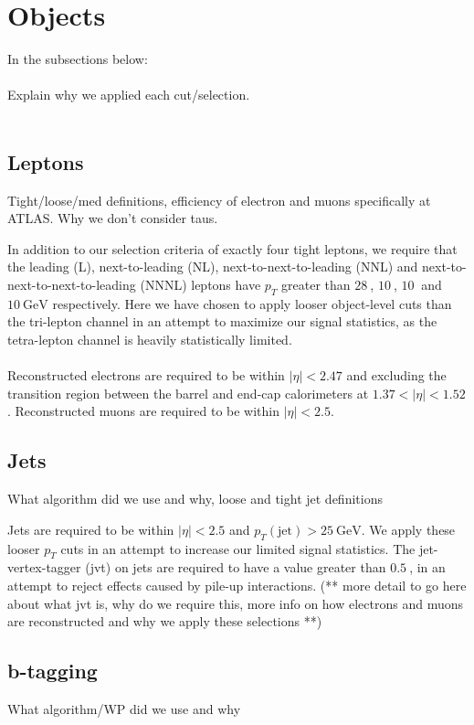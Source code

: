 \section{Objects}
In the subsections below:\\\\
Explain why we applied each cut/selection.\\\\


\subsection{Leptons}
Tight/loose/med definitions, efficiency of electron and muons specifically at ATLAS. Why we don't consider taus.


In addition to our selection criteria of exactly four tight leptons, we require that the leading (L), next-to-leading (NL), next-to-next-to-leading (NNL) and next-to-next-to-next-to-leading (NNNL) leptons have $p_{T}$ greater than $\SI{28}{}$, $\SI{10}{}$, $\SI{10}{}$ and $\SI{10}{\GeV}$ respectively. Here we have chosen to apply looser object-level cuts than the tri-lepton channel in an attempt to maximize our signal statistics, as the tetra-lepton channel is heavily statistically limited.\\\\
Reconstructed electrons are required to be within $|\eta| < 2.47$ and excluding the transition region between the barrel and end-cap calorimeters at $1.37 < |\eta| < 1.52$. Reconstructed muons are required to be within $|\eta| < 2.5$.
\subsection{Jets}
What algorithm did we use and why, loose and tight jet definitions

Jets are required to be within $|\eta| < 2.5$ and $p_{T}(\text{jet}) > \SI{25}{\GeV}$. We apply these looser $p_T$ cuts in an attempt to increase our limited signal statistics. The jet-vertex-tagger (jvt) on jets are required to have a value greater than $\SI{0.5}{}$, in an attempt to reject effects caused by pile-up interactions. (** more detail to go here about what jvt is, why do we require this, more info on how electrons and muons are reconstructed and why we apply these selections **)

\subsection{b-tagging}
What algorithm/WP did we use and why
